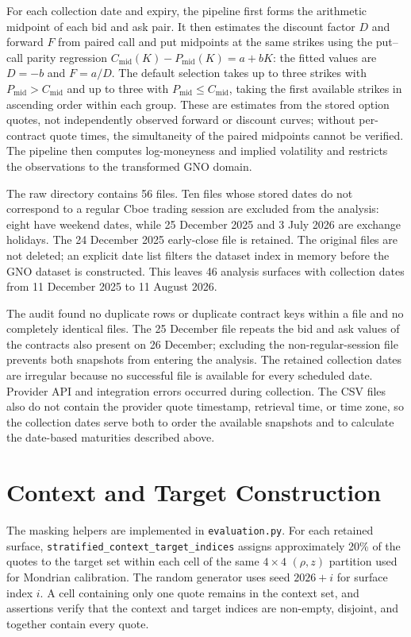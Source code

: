 For each collection date and expiry, the pipeline first forms the arithmetic midpoint of each bid and ask pair. It then estimates the discount factor $D$ and forward $F$ from paired call and put midpoints at the same strikes using the put--call parity regression $C_{\mathrm{mid}}(K)-P_{\mathrm{mid}}(K)=a+bK$: the fitted values are $D=-b$ and $F=a/D$. The default selection takes up to three strikes with $P_{\mathrm{mid}}>C_{\mathrm{mid}}$ and up to three with $P_{\mathrm{mid}}\leq C_{\mathrm{mid}}$, taking the first available strikes in ascending order within each group. These are estimates from the stored option quotes, not independently observed forward or discount curves; without per-contract quote times, the simultaneity of the paired midpoints cannot be verified. The pipeline then computes log-moneyness and implied volatility and restricts the observations to the transformed GNO domain.

The raw directory contains 56 files. Ten files whose stored dates do not correspond to a regular Cboe trading session are excluded from the analysis: eight have weekend dates, while 25 December 2025 and 3 July 2026 are exchange holidays. The 24 December 2025 early-close file is retained. The original files are not deleted; an explicit date list filters the dataset index in memory before the GNO dataset is constructed. This leaves 46 analysis surfaces with collection dates from 11 December 2025 to 11 August 2026.

The audit found no duplicate rows or duplicate contract keys within a file and no completely identical files. The 25 December file repeats the bid and ask values of the contracts also present on 26 December; excluding the non-regular-session file prevents both snapshots from entering the analysis. The retained collection dates are irregular because no successful file is available for every scheduled date. Provider API and integration errors occurred during collection. The CSV files also do not contain the provider quote timestamp, retrieval time, or time zone, so the collection dates serve both to order the available snapshots and to calculate the date-based maturities described above.

\section{Context and Target Construction}
\label{sec:impl_masking}

The masking helpers are implemented in \texttt{evaluation.py}. For each retained surface, \texttt{stratified\_context\_target\_indices} assigns approximately 20\% of the quotes to the target set within each cell of the same $4\times4$ $(\rho,z)$ partition used for Mondrian calibration. The random generator uses seed $2026+i$ for surface index $i$. A cell containing only one quote remains in the context set, and assertions verify that the context and target indices are non-empty, disjoint, and together contain every quote.

